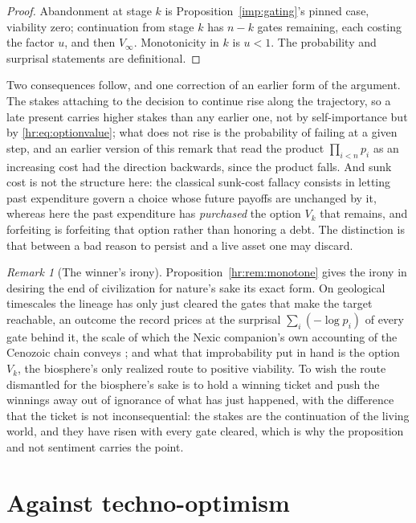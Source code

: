 \documentclass[11pt]{article}
\theoremstyle{plain}
\theoremstyle{definition}
\theoremstyle{remark}
\newtheorem{remark}[theorem]{Remark}
\begin{document}
\begin{proof}
Abandonment at stage $k$ is Proposition~\ref{imp:gating}'s pinned
case, viability zero; continuation from stage $k$ has $n-k$ gates
remaining, each costing the factor $u$, and then $V_\infty$. Monotonicity
in $k$ is $u<1$. The probability and surprisal statements are
definitional.
\end{proof}

\noindent Two consequences follow, and one correction of an earlier
form of the argument. The stakes attaching to the decision to continue
rise along the trajectory, so a late present carries higher stakes than
any earlier one, not by self-importance but by \eqref{hr:eq:optionvalue};
what does not rise is the probability of failing at a given step, and an
earlier version of this remark that read the product $\prod_{i<n}p_i$
as an increasing cost had the direction backwards, since the product
falls. And sunk cost is not the structure here: the classical sunk-cost
fallacy consists in letting past expenditure govern a choice whose
future payoffs are unchanged by it, whereas here the past expenditure
has \emph{purchased} the option $V_k$ that remains, and forfeiting is
forfeiting that option rather than honoring a debt. The distinction is
that between a bad reason to persist and a live asset one may discard.

\begin{remark}[The winner's irony]\label{hr:rem:winnersirony}
Proposition~\ref{hr:rem:monotone} gives the irony in desiring the end
of civilization for nature's sake its exact form. On geological
timescales the lineage has only just cleared the gates that make the
target reachable, an outcome the record prices at the surprisal
$\sum_i(-\log p_i)$ of every gate behind it, the scale of which the
Nexic companion's own accounting of the Cenozoic chain conveys
\cite{Nexus}; and what that improbability put in hand is the option
$V_k$, the biosphere's only realized route to positive viability.
To wish the route dismantled for the biosphere's sake is to hold a
winning ticket and push the winnings away out of ignorance of what has
just happened, with the difference that the ticket is not
inconsequential: the stakes are the continuation of the living world,
and they have risen with every gate cleared, which is why the
proposition and not sentiment carries the point.
\end{remark}

\section{Against techno-optimism}\label{sec:optimism}
\end{document}
